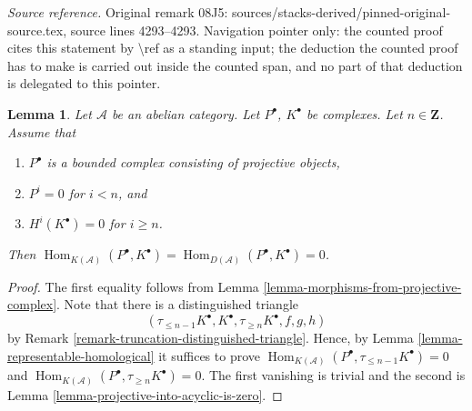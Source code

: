\documentclass{stacks-project}
\theoremstyle{plain}
\newtheorem{lemma}[subsection]{Lemma}
\theoremstyle{definition}
\theoremstyle{remark}
\numberwithin{equation}{subsection}
\def\Hom{\mathop{\mathrm{Hom}}\nolimits}
\begin{document}
\noindent\textit{Source reference.} Original remark 08J5: sources/stacks-derived/pinned-original-source.tex, source lines 4293--4293. Navigation pointer only: the counted proof cites this statement by \textbackslash{}ref as a standing input; the deduction the counted proof has to make is carried out inside the counted span, and no part of that deduction is delegated to this pointer.\par\medskip
\begin{lemma}
\label{lemma-precise-vanishing}
Let $\mathcal{A}$ be an abelian category.
Let $P^\bullet$, $K^\bullet$ be complexes.
Let $n \in \mathbf{Z}$. Assume that
\begin{enumerate}
\item $P^\bullet$ is a bounded complex consisting of projective
objects,
\item $P^i = 0$ for $i < n$, and
\item $H^i(K^\bullet) = 0$ for $i \geq n$.
\end{enumerate}
Then
$\Hom_{K(\mathcal{A})}(P^\bullet, K^\bullet) =
\Hom_{D(\mathcal{A})}(P^\bullet, K^\bullet) = 0$.
\end{lemma}

\begin{proof}
The first equality follows from
Lemma \ref{lemma-morphisms-from-projective-complex}.
Note that there is a distinguished triangle
$$
(\tau_{\leq n - 1}K^\bullet, K^\bullet, \tau_{\geq n}K^\bullet, f, g, h)
$$
by Remark \ref{remark-truncation-distinguished-triangle}. Hence, by
Lemma \ref{lemma-representable-homological}
it suffices to prove
$\Hom_{K(\mathcal{A})}(P^\bullet, \tau_{\leq n - 1}K^\bullet) = 0$ and
$\Hom_{K(\mathcal{A})}(P^\bullet, \tau_{\geq n} K^\bullet) = 0$.
The first vanishing is trivial and the second is
Lemma \ref{lemma-projective-into-acyclic-is-zero}.
\end{proof}
\end{document}
